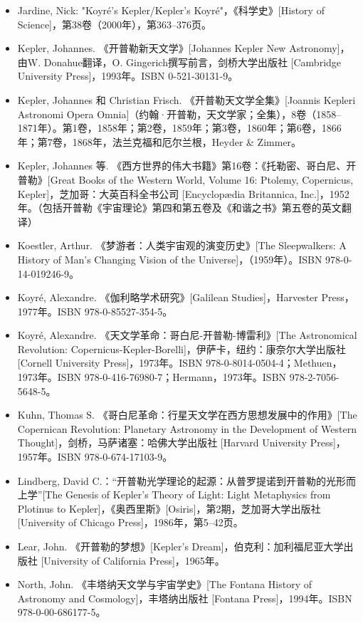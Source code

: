 \begin{itemize}
\item Jardine, Nick: "Koyré's Kepler/Kepler's Koyré"，《科学史》[History of Science]，第38卷（2000年），第363–376页。
\item Kepler, Johannes. 《开普勒新天文学》[Johannes Kepler New Astronomy]，由W. Donahue翻译，O. Gingerich撰写前言，剑桥大学出版社 [Cambridge University Press]，1993年。ISBN 0-521-30131-9。
\item Kepler, Johannes 和 Christian Frisch. 《开普勒天文学全集》[Joannis Kepleri Astronomi Opera Omnia]（约翰·开普勒，天文学家；全集），8卷（1858–1871年）。第1卷，1858年；第2卷，1859年；第3卷，1860年；第6卷，1866年；第7卷，1868年，法兰克福和厄尔兰根，Heyder & Zimmer。
\item Kepler, Johannes 等. 《西方世界的伟大书籍》第16卷：《托勒密、哥白尼、开普勒》[Great Books of the Western World, Volume 16: Ptolemy, Copernicus, Kepler]，芝加哥：大英百科全书公司 [Encyclopædia Britannica, Inc.]，1952年。（包括开普勒《宇宙理论》第四和第五卷及《和谐之书》第五卷的英文翻译）
\item Koestler, Arthur. 《梦游者：人类宇宙观的演变历史》[The Sleepwalkers: A History of Man's Changing Vision of the Universe]，（1959年）。ISBN 978-0-14-019246-9。
\item Koyré, Alexandre. 《伽利略学术研究》[Galilean Studies]，Harvester Press，1977年。ISBN 978-0-85527-354-5。
\item Koyré, Alexandre. 《天文学革命：哥白尼-开普勒-博雷利》[The Astronomical Revolution: Copernicus-Kepler-Borelli]，伊萨卡，纽约：康奈尔大学出版社 [Cornell University Press]，1973年。ISBN 978-0-8014-0504-4；Methuen，1973年。ISBN 978-0-416-76980-7；Hermann，1973年。ISBN 978-2-7056-5648-5。
\item Kuhn, Thomas S. 《哥白尼革命：行星天文学在西方思想发展中的作用》[The Copernican Revolution: Planetary Astronomy in the Development of Western Thought]，剑桥，马萨诸塞：哈佛大学出版社 [Harvard University Press]，1957年。ISBN 978-0-674-17103-9。
\item Lindberg, David C.：“开普勒光学理论的起源：从普罗提诺到开普勒的光形而上学”[The Genesis of Kepler's Theory of Light: Light Metaphysics from Plotinus to Kepler]，《奥西里斯》[Osiris]，第2期，芝加哥大学出版社 [University of Chicago Press]，1986年，第5–42页。
\item Lear, John. 《开普勒的梦想》[Kepler's Dream]，伯克利：加利福尼亚大学出版社 [University of California Press]，1965年。
\item North, John. 《丰塔纳天文学与宇宙学史》[The Fontana History of Astronomy and Cosmology]，丰塔纳出版社 [Fontana Press]，1994年。ISBN 978-0-00-686177-5。

\end{itemize}
